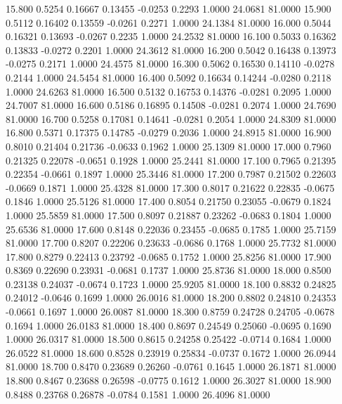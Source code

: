   15.800   0.5254   0.16667   0.13455  -0.0253   0.2293   1.0000  24.0681  81.0000
  15.900   0.5112   0.16402   0.13559  -0.0261   0.2271   1.0000  24.1384  81.0000
  16.000   0.5044   0.16321   0.13693  -0.0267   0.2235   1.0000  24.2532  81.0000
  16.100   0.5033   0.16362   0.13833  -0.0272   0.2201   1.0000  24.3612  81.0000
  16.200   0.5042   0.16438   0.13973  -0.0275   0.2171   1.0000  24.4575  81.0000
  16.300   0.5062   0.16530   0.14110  -0.0278   0.2144   1.0000  24.5454  81.0000
  16.400   0.5092   0.16634   0.14244  -0.0280   0.2118   1.0000  24.6263  81.0000
  16.500   0.5132   0.16753   0.14376  -0.0281   0.2095   1.0000  24.7007  81.0000
  16.600   0.5186   0.16895   0.14508  -0.0281   0.2074   1.0000  24.7690  81.0000
  16.700   0.5258   0.17081   0.14641  -0.0281   0.2054   1.0000  24.8309  81.0000
  16.800   0.5371   0.17375   0.14785  -0.0279   0.2036   1.0000  24.8915  81.0000
  16.900   0.8010   0.21404   0.21736  -0.0633   0.1962   1.0000  25.1309  81.0000
  17.000   0.7960   0.21325   0.22078  -0.0651   0.1928   1.0000  25.2441  81.0000
  17.100   0.7965   0.21395   0.22354  -0.0661   0.1897   1.0000  25.3446  81.0000
  17.200   0.7987   0.21502   0.22603  -0.0669   0.1871   1.0000  25.4328  81.0000
  17.300   0.8017   0.21622   0.22835  -0.0675   0.1846   1.0000  25.5126  81.0000
  17.400   0.8054   0.21750   0.23055  -0.0679   0.1824   1.0000  25.5859  81.0000
  17.500   0.8097   0.21887   0.23262  -0.0683   0.1804   1.0000  25.6536  81.0000
  17.600   0.8148   0.22036   0.23455  -0.0685   0.1785   1.0000  25.7159  81.0000
  17.700   0.8207   0.22206   0.23633  -0.0686   0.1768   1.0000  25.7732  81.0000
  17.800   0.8279   0.22413   0.23792  -0.0685   0.1752   1.0000  25.8256  81.0000
  17.900   0.8369   0.22690   0.23931  -0.0681   0.1737   1.0000  25.8736  81.0000
  18.000   0.8500   0.23138   0.24037  -0.0674   0.1723   1.0000  25.9205  81.0000
  18.100   0.8832   0.24825   0.24012  -0.0646   0.1699   1.0000  26.0016  81.0000
  18.200   0.8802   0.24810   0.24353  -0.0661   0.1697   1.0000  26.0087  81.0000
  18.300   0.8759   0.24728   0.24705  -0.0678   0.1694   1.0000  26.0183  81.0000
  18.400   0.8697   0.24549   0.25060  -0.0695   0.1690   1.0000  26.0317  81.0000
  18.500   0.8615   0.24258   0.25422  -0.0714   0.1684   1.0000  26.0522  81.0000
  18.600   0.8528   0.23919   0.25834  -0.0737   0.1672   1.0000  26.0944  81.0000
  18.700   0.8470   0.23689   0.26260  -0.0761   0.1645   1.0000  26.1871  81.0000
  18.800   0.8467   0.23688   0.26598  -0.0775   0.1612   1.0000  26.3027  81.0000
  18.900   0.8488   0.23768   0.26878  -0.0784   0.1581   1.0000  26.4096  81.0000
